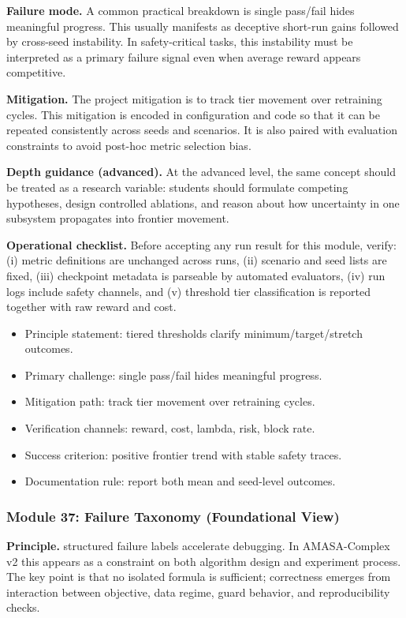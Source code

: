 \documentclass[conference]{IEEEtran}
\begin{document}
\textbf{Failure mode.} A common practical breakdown is single pass/fail hides meaningful progress. This usually manifests as deceptive short-run gains followed by cross-seed instability. In safety-critical tasks, this instability must be interpreted as a primary failure signal even when average reward appears competitive.

\textbf{Mitigation.} The project mitigation is to track tier movement over retraining cycles. This mitigation is encoded in configuration and code so that it can be repeated consistently across seeds and scenarios. It is also paired with evaluation constraints to avoid post-hoc metric selection bias.

\textbf{Depth guidance (advanced).} At the advanced level, the same concept should be treated as a research variable: students should formulate competing hypotheses, design controlled ablations, and reason about how uncertainty in one subsystem propagates into frontier movement.

\textbf{Operational checklist.} Before accepting any run result for this module, verify: (i) metric definitions are unchanged across runs, (ii) scenario and seed lists are fixed, (iii) checkpoint metadata is parseable by automated evaluators, (iv) run logs include safety channels, and (v) threshold tier classification is reported together with raw reward and cost.

\begin{itemize}[leftmargin=*]
  \item Principle statement: tiered thresholds clarify minimum/target/stretch outcomes.
  \item Primary challenge: single pass/fail hides meaningful progress.
  \item Mitigation path: track tier movement over retraining cycles.
  \item Verification channels: reward, cost, lambda, risk, block rate.
  \item Success criterion: positive frontier trend with stable safety traces.
  \item Documentation rule: report both mean and seed-level outcomes.
\end{itemize}


\subsubsection{Module 37: Failure Taxonomy (Foundational View)}
\textbf{Principle.} structured failure labels accelerate debugging. In AMASA-Complex v2 this appears as a constraint on both algorithm design and experiment process. The key point is that no isolated formula is sufficient; correctness emerges from interaction between objective, data regime, guard behavior, and reproducibility checks.
\end{document}
